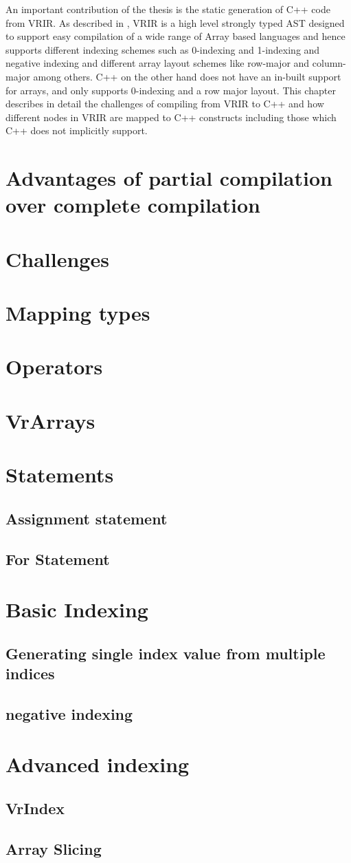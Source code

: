 An important contribution of the thesis is the static generation of C++ code from VRIR. As described in , VRIR is a high level strongly typed AST designed to support easy compilation of a wide range of Array based languages and hence supports different indexing schemes such as 0-indexing and 1-indexing and negative indexing and different array layout schemes like row-major and column-major  among others. C++ on the other hand does not have an in-built support for arrays, and only supports 0-indexing and a row major layout. This chapter describes in detail the challenges of compiling from VRIR to C++ and  how different nodes in VRIR are mapped to C++ constructs including those which C++ does not implicitly support.
\section{Advantages of partial compilation over complete compilation}
\section{Challenges}
\section{Mapping types}
\section{Operators}
\section{VrArrays}
\section{Statements}
\subsection{Assignment statement}
\subsection{For Statement}
\section{Basic Indexing}
\subsection{ Generating single index value from multiple indices}
\subsection{negative indexing}
\section{Advanced indexing}
\subsection{VrIndex}
\subsection{Array Slicing}

